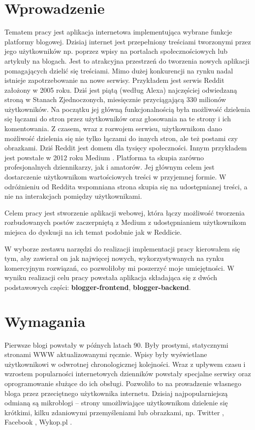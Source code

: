 \documentclass[declaration,shortabstract,polish,inz]{iithesis}
\author         {Oskar Sobczyk}
\date          {\today}                     %
\begin{document}

\chapter{Wprowadzenie}
Tematem pracy jest aplikacja internetowa implementująca wybrane funkcje platformy blogowej. Dzisiaj internet jest przepełniony treściami tworzonymi przez jego użytkowników np. poprzez wpisy na portalach społecznościowych lub artykuły na blogach. Jest to atrakcyjna przestrzeń do tworzenia nowych aplikacji pomagających dzielić się treściami. Mimo dużej konkurencji na rynku nadal istnieje zapotrzebowanie na nowe serwisy. Przykładem jest serwis Reddit \cite{reddit} założony w 2005 roku. Dziś jest piątą (według Alexa) najczęściej odwiedzaną stroną w Stanach Zjednoczonych, miesięcznie przyciągającą 330 milionów użytkowników. Na początku jej główną funkcjonalnością była możliwość dzielenia się łączami do stron przez użytkowników oraz głosowania na te strony i ich komentowania. Z czasem, wraz z rozwojem serwisu, użytkownikom dano możliwość dzielenia się nie tylko łączami do innych stron, ale też postami czy obrazkami. Dziś Reddit jest domem dla tysięcy społeczności. Innym przykładem jest powstałe w 2012 roku Medium \cite{medium}. Platforma ta skupia zarówno profesjonalnych dziennikarzy, jak i amatorów. Jej głównym celem jest dostarczenie użytkownikom wartościowych treści w przyjemnej formie. W odróżnieniu od Reddita wspomniana strona skupia się na udostępnianej treści, a nie na interakcjach pomiędzy użytkownikami.

Celem pracy jest stworzenie aplikacji webowej, która łączy możliwość tworzenia rozbudowanych postów zaczerpniętą z Medium z udostępnianiem użytkownikom miejsca do dyskusji na ich temat podobnie jak w Reddicie.

W wyborze zestawu narzędzi do realizacji implementacji pracy kierowałem się tym, aby zawierał on jak najwięcej nowych, wykorzystywanych na rynku komercyjnym rozwiązań, co pozwoliłoby mi poszerzyć moje umiejętności. W wyniku realizacji celu pracy powstała aplikacja składająca się z dwóch podstawowych części: \textbf{blogger-frontend}, \textbf{blogger-backend}.


\chapter{Wymagania}

Pierwsze blogi powstały w późnych latach 90. Były prostymi, statycznymi stronami WWW aktualizowanymi ręcznie. Wpisy były wyświetlane użytkownikowi w odwrotnej chronologicznej kolejności. Wraz z upływem czasu i wzrostem popularności internetowych dzienników powstały specjalne serwisy oraz oprogramowanie służące do ich obsługi. Pozwoliło to na prowadzenie własnego bloga przez przeciętnego użytkownika internetu. Dzisiaj najpopularniejszą odmianą są mikroblogi – strony umożliwiające użytkownikom dzielenie się krótkimi, kilku zdaniowymi przemyśleniami lub obrazkami, np. Twitter \cite{twitter}, Facebook \cite{facebook}, Wykop.pl \cite{wykop}.
\end{document}
